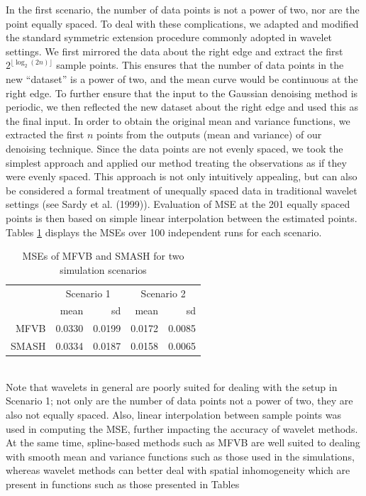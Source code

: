 \documentclass[12pt]{article}
\begin{document}
In the first scenario, the number of data points is not a power of two, nor are the point equally spaced. To deal with these complications, we adapted and modified the standard symmetric extension procedure commonly adopted in wavelet settings. We first mirrored the data about the right edge and extract the first $2^{\lfloor\log_2(2n)\rfloor}$ sample points. This ensures that the number of data points in the new ``dataset'' is a power of two, and the mean curve would be continuous at the right edge. To further ensure that the input to the Gaussian denoising method is periodic, we then reflected the new dataset about the right edge and used this as the final input. In order to obtain the original mean and variance functions, we extracted the first $n$ points from the outputs (mean and variance) of our denoising technique. Since the data points are not evenly spaced, we took the simplest approach and applied our method treating the observations as if they were evenly spaced. This approach is not only intuitively appealing, but can also be considered a formal treatment of unequally spaced data in traditional wavelet settings (see Sardy et al. (1999)). Evaluation of MSE at the 201 equally spaced points is then based on simple linear interpolation between the estimated points. Tables \ref{table:mfvb_comp} displays the MSEs over 100 independent runs for each scenario.
\begin{table}[ht]
\centering
\begin{tabular}{rrrrr}
\hline
& \multicolumn{2}{c}{Scenario 1}&\multicolumn{2}{c}{Scenario 2}\\
\cline{2-5}
& mean & sd & mean & sd \\
\hline
MFVB & 0.0330 & 0.0199 & 0.0172 & 0.0085 \\
SMASH & 0.0334 & 0.0187 & 0.0158 & 0.0065 \\
\hline
\end{tabular}
\caption{MSEs of MFVB and SMASH for two simulation scenarios}
\label{table:mfvb_comp}
\end{table}
\bigskip\\
Note that wavelets in general are poorly suited for dealing with the setup in Scenario 1; not only are the number of data points not a power of two, they are also not equally spaced. Also, linear interpolation between sample points was used in computing the MSE, further impacting the accuracy of wavelet methods. At the same time, spline-based methods such as MFVB are well suited to dealing with smooth mean and variance functions such as those used in the simulations, whereas wavelet methods can better deal with spatial inhomogeneity which are present in functions such as those presented in Tables
\end{document}
